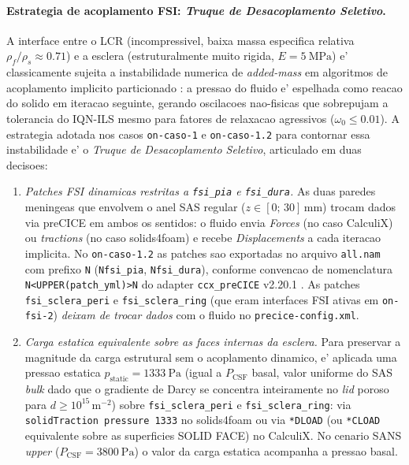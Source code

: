 \paragraph{Estrategia de acoplamento FSI: \emph{Truque de Desacoplamento Seletivo}.} A interface entre o LCR (incompressivel, baixa massa especifica relativa $\rho_f / \rho_s \approx 0.71$) e a esclera (estruturalmente muito rigida, $E = \SI{5}{\mega\pascal}$) e' classicamente sujeita a instabilidade numerica de \emph{added-mass} em algoritmos de acoplamento implicito particionado \citep{Causin2005, Forster2007}: a pressao do fluido e' espelhada como reacao do solido em iteracao seguinte, gerando oscilacoes nao-fisicas que sobrepujam a tolerancia do IQN-ILS mesmo para fatores de relaxacao agressivos ($\omega_0 \le 0.01$). A estrategia adotada nos casos \texttt{on-caso-1} e \texttt{on-caso-1.2} para contornar essa instabilidade e' o \emph{Truque de Desacoplamento Seletivo}, articulado em duas decisoes:
\begin{enumerate}
  \item \emph{Patches FSI dinamicas restritas a \texttt{fsi\_pia} e \texttt{fsi\_dura}.} As duas paredes meningeas que envolvem o anel SAS regular ($z \in [0;\, 30]\,\si{\milli\meter}$) trocam dados via preCICE em ambos os sentidos: o fluido envia \emph{Forces} (no caso CalculiX) ou \emph{tractions} (no caso solids4foam) e recebe \emph{Displacements} a cada iteracao implicita. No \texttt{on-caso-1.2} as patches sao exportadas no arquivo \texttt{all.nam} com prefixo \texttt{N} (\texttt{Nfsi\_pia}, \texttt{Nfsi\_dura}), conforme convencao de nomenclatura \texttt{N<UPPER(patch\_yml)>N} do adapter \texttt{ccx\_preCICE} v2.20.1 \citep{Uekermann2017}. As patches \texttt{fsi\_sclera\_peri} e \texttt{fsi\_sclera\_ring} (que eram interfaces FSI ativas em \texttt{on-fsi-2}) \emph{deixam de trocar dados} com o fluido no \texttt{precice-config.xml}.
  \item \emph{Carga estatica equivalente sobre as faces internas da esclera.} Para preservar a magnitude da carga estrutural sem o acoplamento dinamico, e' aplicada uma pressao estatica $p_{\mathrm{static}} = \SI{1333}{\pascal}$ (igual a $P_{\mathrm{CSF}}$ basal, valor uniforme do SAS \emph{bulk} dado que o gradiente de Darcy se concentra inteiramente no \emph{lid} poroso para $d \ge 10^{15}\,\si{\meter^{-2}}$) sobre \texttt{fsi\_sclera\_peri} e \texttt{fsi\_sclera\_ring}: via \texttt{solidTraction pressure 1333} no solids4foam ou via \texttt{*DLOAD} (ou \texttt{*CLOAD} equivalente sobre as superficies SOLID FACE) no CalculiX. No cenario SANS \emph{upper} ($P_{\mathrm{CSF}} = \SI{3800}{\pascal}$) o valor da carga estatica acompanha a pressao basal.
\end{enumerate}
